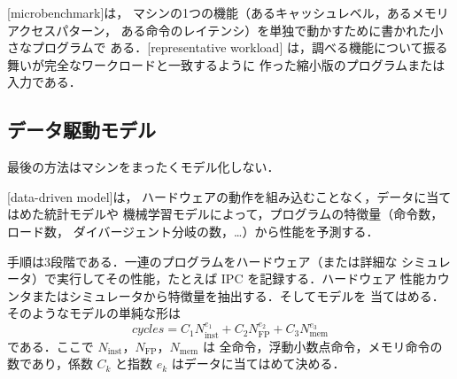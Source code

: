\documentclass[../main.tex]{subfiles}
\begin{document}
\begin{definition}[マイクロベンチマークと代表ワークロード]
  \label{def:l08-microbenchmark}
  [microbenchmark]は，
  マシンの1つの機能（あるキャッシュレベル，あるメモリアクセスパターン，
  ある命令のレイテンシ）を単独で動かすために書かれた小さなプログラムで
  ある．[representative workload]
  は，調べる機能について振る舞いが完全なワークロードと一致するように
  作った縮小版のプログラムまたは入力である．
\end{definition}

\subsection{データ駆動モデル}

最後の方法はマシンをまったくモデル化しない．

\begin{definition}[データ駆動モデル]
  \label{def:l08-data-driven}
  [data-driven model]は，
  ハードウェアの動作を組み込むことなく，データに当てはめた統計モデルや
  機械学習モデルによって，プログラムの特徴量（命令数，ロード数，
  ダイバージェント分岐の数，\dots）から性能を予測する．
\end{definition}

手順は3段階である．一連のプログラムをハードウェア（または詳細な
シミュレータ）で実行してその性能，たとえば IPC を記録する．ハードウェア
性能カウンタまたはシミュレータから特徴量を抽出する．そしてモデルを
当てはめる．そのようなモデルの単純な形は
\begin{equation}
  \textit{cycles} = C_1 N_{\text{inst}}^{e_1}
    + C_2 N_{\text{FP}}^{e_2} + C_3 N_{\text{mem}}^{e_3}
  \label{eq:l08-data-driven}
\end{equation}
である．ここで $N_{\text{inst}}$，$N_{\text{FP}}$，$N_{\text{mem}}$ は
全命令，浮動小数点命令，メモリ命令の数であり，係数 $C_k$ と指数
$e_k$ はデータに当てはめて決める．
\end{document}
